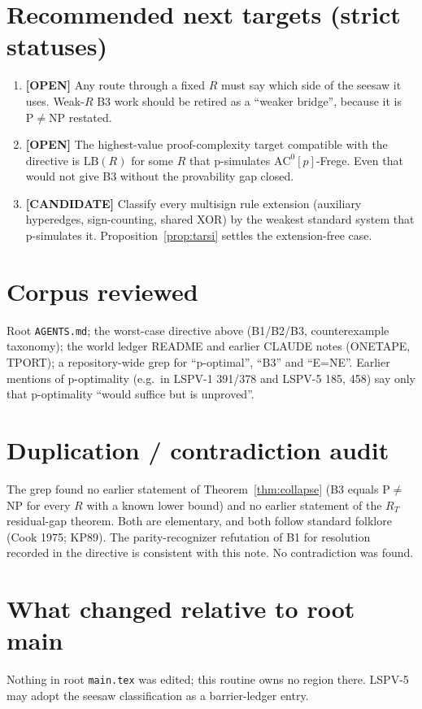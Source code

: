 \documentclass[11pt]{article}
\theoremstyle{definition}
\theoremstyle{remark}
\newcommand{\status}[1]{\textbf{[#1]}}
\begin{document}
\section{Recommended next targets (strict statuses)}
\begin{enumerate}
\item \status{OPEN} Any route through a fixed $R$ must say which side of the seesaw it uses. Weak-$R$ B3
work should be retired as a ``weaker bridge'', because it is $\mathrm P\ne\mathrm{NP}$ restated.
\item \status{OPEN} The highest-value proof-complexity target compatible with the directive is
$\mathrm{LB}(R)$ for some $R$ that p-simulates $\mathrm{AC}^0[p]$-Frege. Even that would not give B3 without
the provability gap closed.
\item \status{CANDIDATE} Classify every multisign rule extension (auxiliary hyperedges, sign-counting,
shared XOR) by the weakest standard system that p-simulates it. Proposition~\ref{prop:tarsi} settles the
extension-free case.
\end{enumerate}

\section*{Corpus reviewed}
Root \texttt{AGENTS.md}; the worst-case directive above (B1/B2/B3, counterexample taxonomy); the world ledger
README and earlier CLAUDE notes (ONETAPE, TPORT); a repository-wide grep for ``p-optimal'', ``B3'' and
``E=NE''. Earlier mentions of p-optimality (e.g.\ in LSPV-1 391/378 and LSPV-5 185, 458) say only that
p-optimality ``would suffice but is unproved''.

\section*{Duplication / contradiction audit}
The grep found no earlier statement of Theorem~\ref{thm:collapse} (B3 equals P$\ne$NP for every $R$ with a
known lower bound) and no earlier statement of the $R_T$ residual-gap theorem. Both are elementary, and both
follow standard folklore (Cook 1975; KP89). The parity-recognizer refutation of B1 for resolution recorded in
the directive is consistent with this note. No contradiction was found.

\section*{What changed relative to root main}
Nothing in root \texttt{main.tex} was edited; this routine owns no region there. LSPV-5 may adopt the seesaw
classification as a barrier-ledger entry.
\end{document}
